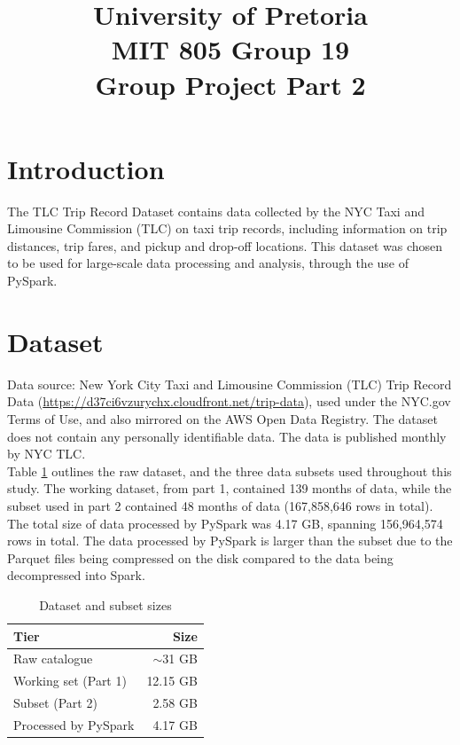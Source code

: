 \documentclass[conference]{IEEEtran}
\begin{document}
\title{University of Pretoria \\MIT 805 Group 19\\Group Project Part 2\\}

\author{
\and
{}}


\maketitle
\section{Introduction}
The TLC Trip Record Dataset contains data collected by the NYC Taxi and Limousine Commission (TLC) on taxi trip records, including information on trip distances, trip fares, and pickup and drop-off locations. This dataset was chosen to be used for large-scale data processing and analysis, through the use of PySpark.

\section{Dataset}
Data source: New York City Taxi and Limousine Commission (TLC) Trip Record Data
(\url{https://d37ci6vzurychx.cloudfront.net/trip-data}), used under the NYC.gov Terms
of Use, and also mirrored on the AWS Open Data Registry. The dataset does not contain any personally identifiable data. The data is published monthly by NYC TLC. \\

Table \ref{tab:dataset-sizes} outlines the raw dataset, and the three data subsets used throughout this study. The working dataset, from part 1, contained 139 months of data, while the subset used in part 2 contained 48 months of data (167,858,646 rows in total). The total size of data processed by PySpark was 4.17 GB, spanning 156,964,574 rows in total. The data processed by PySpark is larger than the subset due to the Parquet files being compressed on the disk compared to the data being decompressed into Spark.\\

\begin{table}[b]
\centering
\caption{Dataset and subset sizes}
\label{tab:dataset-sizes}
\begin{tabular}{lr}\toprule
Tier & Size \\\midrule
Raw catalogue & $\sim$31 GB \\
Working set (Part 1) & 12.15 GB \\
Subset (Part 2) & 2.58 GB \\
Processed by PySpark & 4.17 GB \\\bottomrule
\end{tabular}
\end{table}
\end{document}
